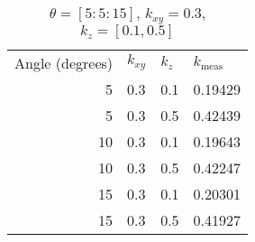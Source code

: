\begin{table}[H]
\caption{\(\theta=[5:5:15]\), \(k_{xy} = 0.3\), \(k_z = [0.1, 0.5]\)}
\begin{tabular}{r l l | l}
Angle (degrees) & \(k_{xy}\) & \(k_z\) & \(k_{\textrm{meas}}\)\\
5 & 0.3 & 0.1 & 0.19429\\
5 & 0.3 & 0.5 & 0.42439\\
10 & 0.3 & 0.1 & 0.19643\\
10 & 0.3 & 0.5 & 0.42247\\
15 & 0.3 & 0.1 & 0.20301\\
15 & 0.3 & 0.5 & 0.41927\\
\end{tabular}
\end{table}
